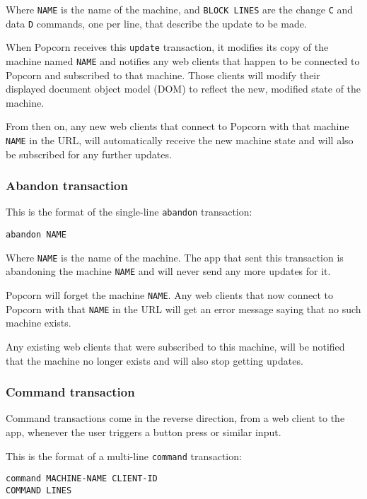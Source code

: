 \documentclass[12pt]{article}
\begin{document}
Where \verb`NAME` is the name of the machine, and \verb`BLOCK LINES` are the
change \verb`C` and data \verb`D` commands, one per line, that describe the
update to be made.

When Popcorn receives this \verb`update` transaction, it modifies its copy
of the machine named \verb`NAME` and notifies any web clients that happen
to be connected to Popcorn and subscribed to that machine. Those
clients will modify their displayed document object model (DOM) to
reflect the new, modified state of the machine.

From then on, any new web clients that connect to Popcorn with that
machine \verb`NAME` in the URL, will automatically receive the new machine
state and will also be subscribed for any further updates.

\subsubsection{Abandon transaction}

This is the format of the single-line \verb`abandon` transaction:

\begin{verbatim}
abandon NAME
\end{verbatim}

Where \verb`NAME` is the name of the machine. The app that sent this
transaction is abandoning the machine \verb`NAME` and will never send any
more updates for it.

Popcorn will forget the machine \verb`NAME`. Any web clients that now
connect to Popcorn with that \verb`NAME` in the URL will get an error
message saying that no such machine exists.

Any existing web clients that were subscribed to this machine, will be
notified that the machine no longer exists and will also stop getting
updates.

\subsubsection{Command transaction}

Command transactions come in the reverse direction, from a web client
to the app, whenever the user triggers a button press or similar
input.

This is the format of a multi-line \verb`command` transaction:

\begin{verbatim}
command MACHINE-NAME CLIENT-ID
COMMAND LINES
\end{verbatim}
\end{document}

